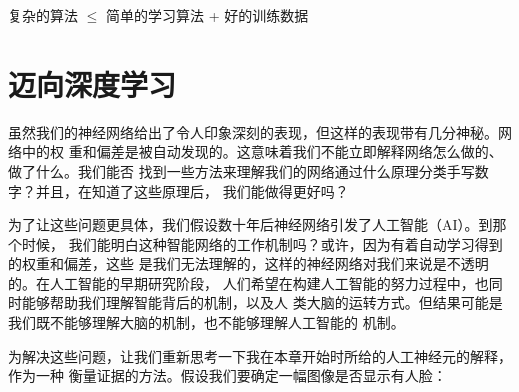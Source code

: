 \begin{center}
  复杂的算法 $\leq$ 简单的学习算法 + 好的训练数据
\end{center}

\section{迈向深度学习}

虽然我们的神经网络给出了令人印象深刻的表现，但这样的表现带有几分神秘。网络中的权
重和偏差是被自动发现的。这意味着我们不能立即解释网络怎么做的、做了什么。我们能否
找到一些方法来理解我们的网络通过什么原理分类手写数字？并且，在知道了这些原理后，
我们能做得更好吗？

为了让这些问题更具体，我们假设数十年后神经网络引发了人工智能（AI）。到那个时候，
我们能明白这种智能网络的工作机制吗？或许，因为有着自动学习得到的权重和偏差，这些
是我们无法理解的，这样的神经网络对我们来说是不透明的。在人工智能的早期研究阶段，
人们希望在构建人工智能的努力过程中，也同时能够帮助我们理解智能背后的机制，以及人
类大脑的运转方式。但结果可能是我们既不能够理解大脑的机制，也不能够理解人工智能的
机制。

为解决这些问题，让我们重新思考一下我在本章开始时所给的人工神经元的解释，作为一种
衡量证据的方法。假设我们要确定一幅图像是否显示有人脸：

